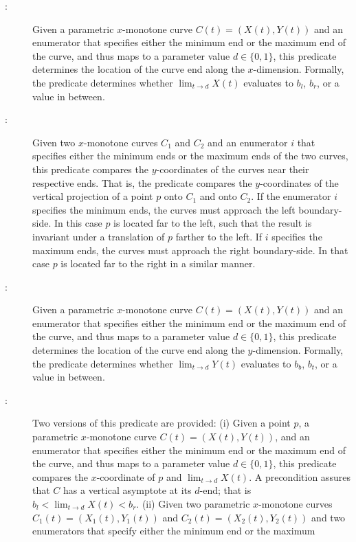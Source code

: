 \begin{description}
\item[:]
  Given a parametric $x$-monotone curve $C(t) = (X(t),Y(t))$ and an
  enumerator that specifies either the minimum end or the maximum end
  of the curve, and thus maps to a parameter value $d \in \{0,1\}$,
  this predicate determines the location of the curve end along the
  $x$-dimension. Formally, the predicate determines whether
  $\lim_{t \rightarrow d} X(t)$ evaluates to $b_l$, $b_r$, or a value
  in between.
\item[:]
  Given two $x$-monotone curves $C_1$ and $C_2$ and an enumerator $i$
  that specifies either the minimum ends or the maximum ends of the
  two curves, this predicate compares the $y$-coordinates of the
  curves near their respective ends. That is, the predicate compares
  the $y$-coordinates of the vertical projection of a point $p$ onto
  $C_1$ and onto $C_2$. If the enumerator $i$ specifies the minimum
  ends, the curves must approach the left boundary-side. In this case
  $p$ is located far to the left, such that the result is invariant
  under a translation of $p$ farther to the left. If $i$ specifies the
  maximum ends, the curves must approach the right boundary-side. In
  that case $p$ is located far to the right in a similar manner.
\item[:]
  Given a parametric $x$-monotone curve $C(t) = (X(t),Y(t))$ and an
  enumerator that specifies either the minimum end or the maximum end
  of the curve, and thus maps to a parameter value $d \in \{0,1\}$,
  this predicate determines the location of the curve end along the
  $y$-dimension. Formally, the predicate determines whether
  $\lim_{t \rightarrow d} Y(t)$ evaluates to $b_b$, $b_t$, or a value
  in between.
\item[:]
  Two versions of this predicate are provided:
  (i) Given a point $p$, a parametric $x$-monotone curve
    $C(t) = (X(t),Y(t))$, and an enumerator that specifies either the
    minimum end or the maximum end of the curve, and thus maps to a
    parameter value $d \in \{0,1\}$, this predicate compares the
    $x$-coordinate of $p$ and $\lim_{t \rightarrow d} X(t)$. A
    precondition assures that $C$ has a vertical asymptote at its
    $d$-end; that is $b_l < \lim_{t \rightarrow d} X(t) < b_r$.
  (ii) Given two parametric $x$-monotone curves
    $C_1(t) = (X_1(t),Y_1(t))$ and $C_2(t) = (X_2(t),Y_2(t))$ and two
    enumerators that specify either the minimum end or the maximum

\end{description}
